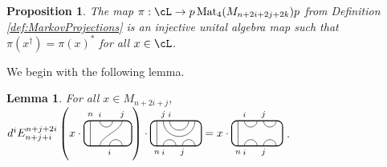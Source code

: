 \documentclass[11pt]{article}
\theoremstyle{plain}
\newtheorem{lem}[thm]{Lemma}
\newtheorem{prop}[thm]{Proposition}
\theoremstyle{definition}
\begin{document}
\begin{prop}
\label{prop:InjectiveAlgebraMap}
The map $\pi: \cL \to p\operatorname{Mat}_4(M_{n+2i+2j+2k})p$ from Definition \ref{def:MarkovProjections} is an injective unital algebra map such that $\pi(x^\dag) = \pi(x)^*$ for all $x\in \cL$.
\end{prop}


We begin with the following lemma.

 \begin{lem}
 \label{lem:LeftKink}
For all $x \in M_{n+2i+j}$,
$
d^i
E^{n+j+2i}_{n+j+i}
\left(
x
\cdot
\begin{tikzpicture}[baseline = .3cm]
 \draw[thick, rounded corners = 5pt] (0,0) rectangle (1.5,.8);
 \draw (.2,0) -- (.2,.8);
 \draw (.5,.8) arc (-180:0:.2cm);
 \draw (.5,0) .. controls ++(90:.3cm) and ++(270:.3cm) .. (1.2,.8);
 \draw (.8,0) arc (180:0:.2cm);
 \node at (.2,1) {\scriptsize{$n$}};
 \node at (.5,1) {\scriptsize{$i$}};
 \node at (1.2,1) {\scriptsize{$j$}};
 \node at (.8,-.2) {\scriptsize{$i$}};
\end{tikzpicture}
\right)
\cdot
\begin{tikzpicture}[baseline=.3cm]
 \draw[thick, rounded corners = 5pt] (0,0) rectangle (1.6,.8);
 \draw (.2,0) -- (.2,.8);
 \draw (0.4,.8) arc (-180:0:.5);
 \draw (0.6,.8) arc (-180:0:.3);
 \draw (0.4,0) arc (180:0:.2);
 \draw (1,0) arc (180:0:.2);
 \node at (.2,-.2) {\scriptsize{$n$}};
 \node at (.4,1) {\scriptsize{$j$}};
 \node at (.6,1) {\scriptsize{$i$}};
 \node at (.4,-.2) {\scriptsize{$i$}};
 \node at (1,-.2) {\scriptsize{$j$}};
\end{tikzpicture}
=
x\cdot
\begin{tikzpicture}[baseline=.3cm]
 \draw[thick, rounded corners = 5pt] (0,0) rectangle (1.6,.8);
 \draw (.2,0) -- (.2,.8);
 \draw (0.4,0) arc (180:0:.2);
 \draw (1,0) arc (180:0:.2);
 \draw (0.4,.8) arc (-180:0:.2);
 \draw (1,.8) arc (-180:0:.2);
 \node at (.2,-.2) {\scriptsize{$n$}};
 \node at (.4,-.2) {\scriptsize{$i$}};
 \node at (1,-.2) {\scriptsize{$j$}};
 \node at (.4,1) {\scriptsize{$i$}};
 \node at (1,1) {\scriptsize{$j$}};
\end{tikzpicture}
$\,.
\end{lem}
\end{document}
